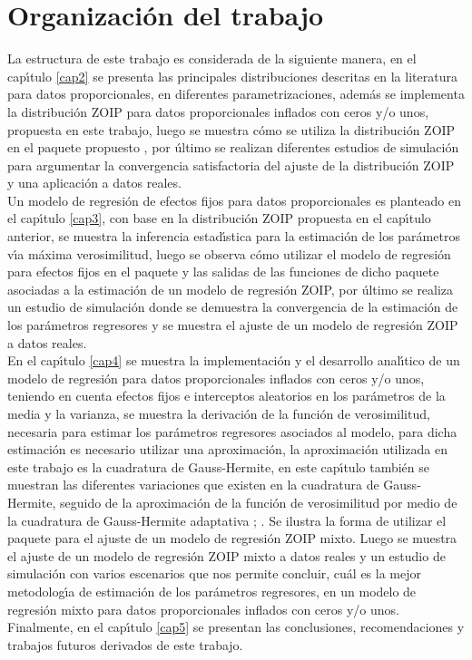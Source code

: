\section*{Organizaci\'{o}n del trabajo}

La estructura de este trabajo es considerada de la siguiente manera, en el cap\'{\i}tulo \ref{cap2} se presenta las principales distribuciones descritas en la literatura para datos proporcionales, en diferentes parametrizaciones, adem\'{a}s se implementa la distribuci\'{o}n ZOIP para datos proporcionales inflados con ceros y/o unos, propuesta en este trabajo, luego se muestra c\'{o}mo se utiliza la distribuci\'{o}n ZOIP en el paquete propuesto , por \'{u}ltimo se realizan di\-fe\-ren\-tes estudios de simulaci\'{o}n para argumentar la convergencia satisfactoria del ajuste de la distribuci\'{o}n ZOIP y una aplicaci\'{o}n a datos reales.\\

Un modelo de regresi\'{o}n de efectos fijos para datos proporcionales es planteado en el cap\'{\i}tulo \ref{cap3}, con base en la distribuci\'{o}n ZOIP propuesta en el cap\'{\i}tulo anterior, se muestra la inferencia estad\'{\i}stica para la estimaci\'{o}n de los par\'{a}metros v\'{\i}a m\'{a}xima verosimilitud, luego se observa c\'{o}mo utilizar el modelo de regresi\'{o}n para efectos fijos en el paquete  y las salidas de las funciones de dicho paquete asociadas a la estimaci\'{o}n de un modelo de regresi\'{o}n ZOIP, por \'{u}ltimo se realiza un estudio de simulaci\'{o}n donde se demuestra la convergencia de la estimaci\'{o}n de los par\'{a}metros regresores y se muestra el ajuste de un modelo de regresi\'{o}n ZOIP a datos reales.\\

En el cap\'{\i}tulo \ref{cap4} se muestra la implementaci\'{o}n y el desarrollo anal\'{\i}tico de un modelo de regresi\'{o}n para datos proporcionales inflados con ceros y/o unos, teniendo en cuenta efectos fijos e interceptos aleatorios en los par\'{a}metros de la media y la varianza, se muestra la derivaci\'{o}n de la funci\'{o}n de verosimilitud, necesaria para estimar los par\'{a}metros regresores asociados al modelo, para dicha estimaci\'{o}n es necesario utilizar una aproximaci\'{o}n, la aproximaci\'{o}n utilizada en este trabajo es la cuadratura de Gauss-Hermite, en este cap\'{\i}tulo tambi\'{e}n se muestran las diferentes variaciones que existen en la cuadratura de Gauss-Hermite, seguido de la aproximaci\'{o}n de la funci\'{o}n de verosimilitud por medio de la cuadratura de Gauss-Hermite adaptativa \citep{Liu1}; \citep{Pinheiro1}. Se ilustra la forma de utilizar el paquete  para el ajuste de un modelo de regresi\'{o}n ZOIP mixto. Luego se muestra el ajuste de un modelo de regresi\'{o}n ZOIP mixto a datos reales y un estudio de simulaci\'{o}n con varios escenarios que nos permite concluir, cu\'{a}l es la mejor metodolog\'{\i}a de estimaci\'{o}n de los par\'{a}metros regresores, en un modelo de regresi\'{o}n mixto para datos proporcionales inflados con ceros y/o unos.\\

Finalmente, en el cap\'{\i}tulo \ref{cap5} se presentan las conclusiones, recomendaciones y trabajos futuros derivados de este trabajo.


 









